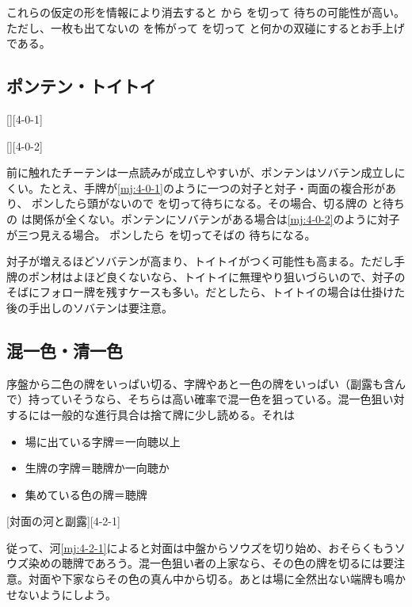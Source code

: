 \documentclass[10pt, twocolumn]{article}
\begin{document}
これらの仮定の形を情報により消去すると  から  を切って  待ちの可能性が高い。ただし、一枚も出てないの  を怖がって  を切って  と何かの双碰にするとお手上げである。

\subsection{ポンテン・トイトイ}

[][4-0-1]

[][4-0-2]

前に触れたチーテンは一点読みが成立しやすいが、ポンテンはソバテン成立しにくい\citep[][p.~67]{takizawa-yomi}。たとえ、手牌が\ref{mj:4-0-1}のように一つの対子と対子・両面の複合形があり、 ポンしたら頭がないので  を切って待ちになる。その場合、切る牌の  と待ちの  は関係が全くない。ポンテンにソバテンがある場合は\ref{mj:4-0-2}のように対子が三つ見える場合。 ポンしたら  を切ってそばの  待ちになる。

対子が増えるほどソバテンが高まり、トイトイがつく可能性も高まる\citep[][p.~68]{takizawa-yomi}。ただし手牌のポン材はよほど良くないなら、トイトイに無理やり狙いづらいので、対子のそばにフォロー牌を残すケースも多い。だとしたら、トイトイの場合は仕掛けた後の手出しのソバテンは要注意。

\subsection{混一色・清一色}

序盤から二色の牌をいっぱい切る、字牌やあと一色の牌をいっぱい（副露も含んで）持っていそうなら、そちらは高い確率で混一色を狙っている\citep[][pp.~47--50]{takizawa-yomi}。混一色狙い対するには一般的な進行具合は捨て牌に少し読める。それは

\begin{itemize}
  \item 場に出ている字牌＝一向聴以上
  \item 生牌の字牌＝聴牌か一向聴か
  \item 集めている色の牌＝聴牌
\end{itemize}

[対面の河と副露][4-2-1]

従って、河\ref{mj:4-2-1}によると対面は中盤からソウズを切り始め、おそらくもうソウズ染めの聴牌であろう。混一色狙い者の上家なら、その色の牌を切るには要注意。対面や下家ならその色の真ん中から切る。あとは場に全然出ない端牌も鳴かせないようにしよう。
\end{document}
